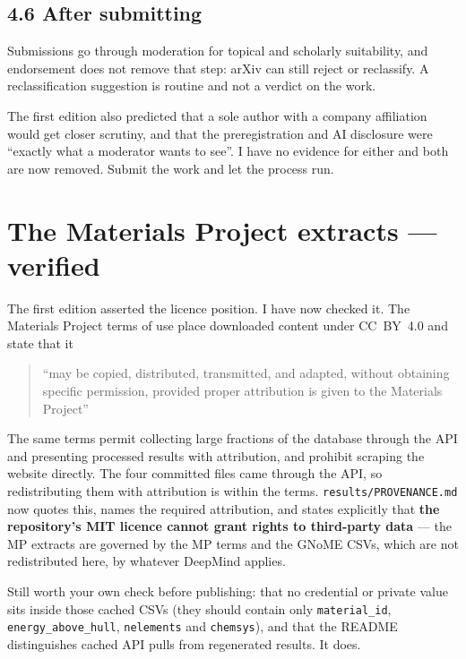\documentclass[11pt]{article}
\begin{document}
\subsection*{4.6 After submitting}

Submissions go through moderation for topical and scholarly suitability, and endorsement
does not remove that step: arXiv can still reject or reclassify. A reclassification
suggestion is routine and not a verdict on the work.

The first edition also predicted that a sole author with a company affiliation would get
closer scrutiny, and that the preregistration and AI disclosure were ``exactly what a
moderator wants to see''. I have no evidence for either and both are now removed. Submit the
work and let the process run.

\section{The Materials Project extracts --- verified}

The first edition asserted the licence position. I have now checked it. The Materials
Project terms of use place downloaded content under CC~BY~4.0 and state that it

\begin{quote}
``may be copied, distributed, transmitted, and adapted, without obtaining specific
permission, provided proper attribution is given to the Materials Project''
\end{quote}

The same terms permit collecting large fractions of the database through the API and
presenting processed results with attribution, and prohibit scraping the website directly.
The four committed files came through the API, so redistributing them with attribution is
within the terms. \texttt{results/PROVENANCE.md} now quotes this, names the required
attribution, and states explicitly that \textbf{the repository's MIT licence cannot grant
rights to third-party data} --- the MP extracts are governed by the MP terms and the GNoME
CSVs, which are not redistributed here, by whatever DeepMind applies.

Still worth your own check before publishing: that no credential or private value sits
inside those cached CSVs (they should contain only \texttt{material\_id},
\texttt{energy\_above\_hull}, \texttt{nelements} and \texttt{chemsys}), and that the README
distinguishes cached API pulls from regenerated results. It does.
\end{document}
